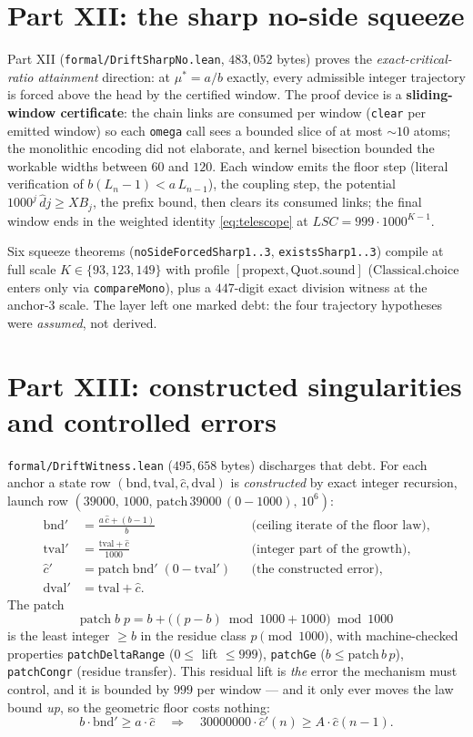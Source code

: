\documentclass[11pt]{article}
\newcommand{\dhat}{\widehat{d}}
\newcommand{\chat}{\widehat{c}}
\begin{document}
\section{Part XII: the sharp no-side squeeze}\label{sec:sharp}

Part XII (\texttt{formal/DriftSharpNo.lean}, $483{,}052$ bytes) proves the
\emph{exact-critical-ratio attainment} direction: at $\mu^\ast=a/b$ exactly, every
admissible integer trajectory is forced above the head by the certified window. The proof
device is a \textbf{sliding-window certificate}: the chain links are consumed per window
(\texttt{clear} per emitted window) so each \texttt{omega} call sees a bounded slice of at
most ${\sim}10$ atoms; the monolithic encoding did not elaborate, and kernel bisection
bounded the workable widths between $60$ and $120$. Each window emits the floor step
(literal verification of $b(L_n-1)<a\,L_{n-1}$), the coupling step, the potential
$1000^j\,\dhat j\ge XB_j$, the prefix bound, then clears its consumed links; the final
window ends in the weighted identity \eqref{eq:telescope} at $LSC=999\cdot1000^{K-1}$.

Six squeeze theorems (\texttt{noSideForcedSharp1..3}, \texttt{existsSharp1..3}) compile at
full scale $K\in\{93,123,149\}$ with profile $[\mathrm{propext},\mathrm{Quot.sound}]$
($\mathrm{Classical.choice}$ enters only via \texttt{compareMono}), plus a $447$-digit exact
division witness at the anchor-3 scale. The layer left one marked debt: the four trajectory
hypotheses were \emph{assumed}, not derived.

\section{Part XIII: constructed singularities and controlled errors}\label{sec:witness}

\texttt{formal/DriftWitness.lean} ($495{,}658$ bytes) discharges that debt. For each anchor
a state row $(\mathrm{bnd},\mathrm{tval},\chat,\mathrm{dval})$ is \emph{constructed} by
exact integer recursion, launch row $(39000,\,1000,\,\mathrm{patch}\,39000\,(0-1000),\,10^6)$:
\begin{align}
\mathrm{bnd}'&=\frac{a\,\chat+(b-1)}{b} &&\text{(ceiling iterate of the floor law)},\\
\mathrm{tval}'&=\frac{\mathrm{tval}+\chat}{1000} &&\text{(integer part of the growth)},\\
\chat'&=\mathrm{patch}\;\mathrm{bnd}'\;(0-\mathrm{tval}') &&\text{(the constructed error)},\\
\mathrm{dval}'&=\mathrm{tval}+\chat .
\end{align}
The patch
\[
\mathrm{patch}\; b\; p
= b+\bigl((p-b)\bmod 1000+1000\bigr)\bmod 1000
\]
is the least integer $\ge b$ in the residue class $p\pmod{1000}$, with machine-checked
properties \texttt{patchDeltaRange} ($0\le$ lift $\le 999$), \texttt{patchGe}
($b\le \mathrm{patch}\,b\,p$), \texttt{patchCongr} (residue transfer). This residual lift is
\emph{the} error the mechanism must control, and it is bounded by $999$ per window --- and it
only ever moves the law bound \emph{up}, so the geometric floor costs nothing:
\[
b\cdot\mathrm{bnd}'\ge a\cdot\chat \quad\Longrightarrow\quad
30000000\cdot \chat'(n)\ge A\cdot \chat(n-1).
\]
\end{document}
